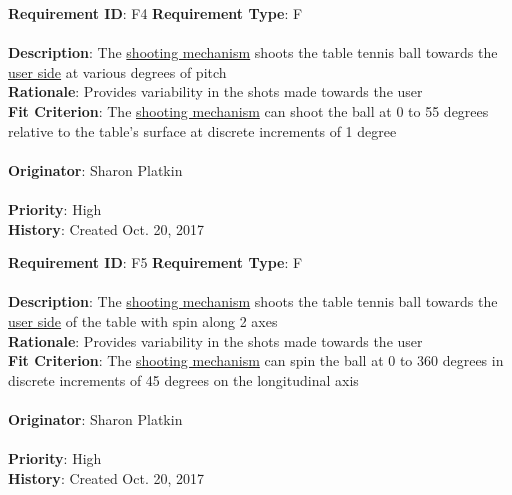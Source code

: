 \documentclass[11pt]{article}
\begin{document}
\begin{framed}
	\noindent\textbf{Requirement ID}: F4 \hfill \textbf{Requirement Type}: F \hfill\\\\
	\noindent\textbf{Description}: The \hyperref[sec:definitions]{shooting mechanism} shoots the table tennis ball towards the \hyperref[sec:definitions]{user side} at various degrees of pitch \\
	\textbf{Rationale}: Provides variability in the shots made towards the user \\
	\textbf{Fit Criterion}: The \hyperref[sec:definitions]{shooting mechanism} can shoot the ball at 0 to 55 degrees relative to the table's surface at discrete increments of 1 degree\\\\
	\textbf{Originator}: Sharon Platkin \\\\
	\textbf{Priority}: High \hfill \\
	\noindent\textbf{History}: Created Oct. 20, 2017
\end{framed}

\begin{framed}
	\noindent\textbf{Requirement ID}: F5 \hfill \textbf{Requirement Type}: F \hfill\\\\
	\noindent\textbf{Description}: The \hyperref[sec:definitions]{shooting mechanism} shoots the table tennis ball towards the \hyperref[sec:definitions]{user side} of the table with spin along 2 axes \\
	\textbf{Rationale}: Provides variability in the shots made towards the user \\
	\textbf{Fit Criterion}: The \hyperref[sec:definitions]{shooting mechanism} can spin the ball at 0 to 360 degrees in discrete increments of 45 degrees on the longitudinal axis\\\\ %
	\textbf{Originator}: Sharon Platkin \\\\
	\textbf{Priority}: High \hfill \\
	\noindent\textbf{History}: Created Oct. 20, 2017
\end{framed}
\end{document}
